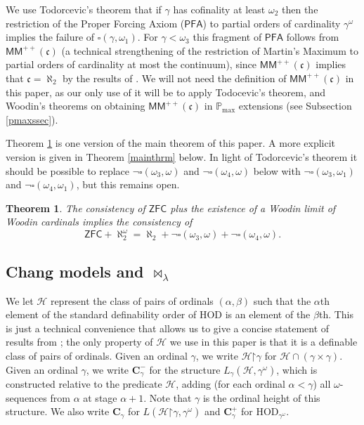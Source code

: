 \documentclass[12pt]{article}
\newtheorem{theorem}{Theorem}[section]
\def\c{{\mathbf{C}}}
\def\cH{{\mathcal{H}}}
\newcommand{\ZFC}{\mathsf{ZFC}}
\newcommand{\pmax}{\mathbb{P}_{\mathrm{max}}}
\newcommand{\HOD}{\mathrm{HOD}}
\newcommand{\MM}{\mathsf{MM}}
\newcommand{\less}{\mathord{<}}
\newcommand{\restrict}{\mathord{\upharpoonright}}
\newcommand{\PFA}{\mathsf{PFA}}
\begin{document}
We use Todorcevic's theorem \cite{Stevo_square} that if $\gamma$ has cofinality at least $\omega_{2}$ then the restriction of the Proper Forcing Axiom ($\PFA$) to partial orders of cardinality $\gamma^{\omega}$ implies the failure of $\square(\gamma, \omega_{1})$. For $\gamma < \omega_3$ this fragment of $\PFA$ follows from $\MM^{++}(\mathfrak{c})$ (a technical strengthening of the restriction of Martin's Maximum to partial orders of cardinality at most the continuum), since $\MM^{++}(\mathfrak{c})$ implies that $\mathfrak{c} = \aleph_{2}$ by the results of \cite{FMSI}. We will not need the definition of $\MM^{++}(\mathfrak{c})$ in this paper, as our only use of it will be to apply Todocevic's theorem, and Woodin's theorems on obtaining $\MM^{++}(\mathfrak{c})$ in $\pmax$ extensions (see Subsection \ref{pmaxssec}).

Theorem \ref{weakmain} is one version of the main theorem of this paper. A more explicit version is given in Theorem \ref{mainthrm} below. In light of Todorcevic's theorem it should be possible to replace $\neg\square(\omega_{3}, \omega)$  and $\neg\square(\omega_{4}, \omega)$ below with $\neg\square(\omega_{3}, \omega_1)$ and $\neg\square(\omega_{4}, \omega_1)$, but this remains open.

\begin{theorem}\label{weakmain} The consistency of $\ZFC$ plus the existence of a Woodin limit of Woodin cardinals implies the consistency of \[\ZFC + \aleph_2^\omega=\aleph_2 + \neg\square(\omega_{3}, \omega)  + \neg\square(\omega_{4}, \omega).\]
\end{theorem}


\subsection{Chang models and $\Join_{\lambda}$}\label{cmjoinssec}

We let $\cH$ represent the class of pairs of ordinals $(\alpha, \beta)$ such that the $\alpha$th element of the standard definability order of $\HOD$ is an element of the $\beta$th. This is just a technical convenience that allows us to give a concise statement of results from \cite{Changmodels_1}; the only property of $\cH$ we use in this paper is that it is a definable class of pairs of ordinals. Given an ordinal $\gamma$, we write $\cH\restrict \gamma$ for $\cH \cap (\gamma \times \gamma)$. Given an ordinal $\gamma$,
we write $\c_\gamma^{-}$ for the structure $L_\gamma(\cH, \gamma^{\omega})$, which is constructed relative to the predicate $\cH$, adding (for each ordinal $\alpha < \gamma$) all $\omega$-sequences from $\alpha$ at stage $\alpha + 1$. Note that $\gamma$ is the ordinal height of this structure. We also write $\c_\gamma$ for $L(\cH\restrict \gamma, \gamma^{\omega})$ and $\c^+_\gamma$ for $\HOD_{\gamma^{\omega}}$.
\end{document}
